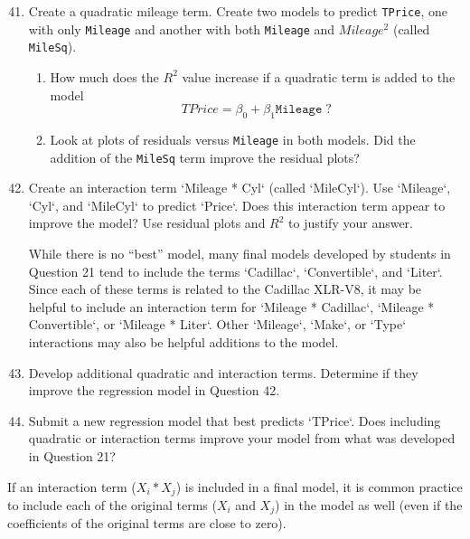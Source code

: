 \documentclass[
]{report}
\begin{document}
\begin{enumerate}
  \setcounter{enumi}{40}

  \item Create a quadratic mileage term. Create two models to predict \texttt{TPrice}, one with only \texttt{Mileage} and another with both \texttt{Mileage} and $\scriptstyle Mileage^2$ (called \texttt{MileSq}).

  \begin{enumerate}
    \item How much does the $\scriptstyle {R}^2$ value increase if a quadratic term is added to the model
    \[
      TPrice = \beta_0 + \beta_1 \texttt{Mileage} \; ?
    \]
    
    \item Look at plots of residuals versus \texttt{Mileage} in both models. Did the addition of the \texttt{MileSq} term improve the residual plots?
  \end{enumerate}

  \item Create an interaction term `Mileage * Cyl` (called `MileCyl`). Use `Mileage`, `Cyl`, and `MileCyl` to predict `Price`. Does this interaction term appear to improve the model? Use residual plots and $\scriptstyle {R}^2$ to justify your answer.

  While there is no “best” model, many final models developed by students in Question 21 tend to include the terms `Cadillac`, `Convertible`, and `Liter`. Since each of these terms is related to the Cadillac XLR-V8, it may be helpful to include an interaction term for `Mileage * Cadillac`, `Mileage * Convertible`, or `Mileage * Liter`. Other `Mileage`, `Make`, or `Type` interactions may also be helpful additions to the model.

  \item Develop additional quadratic and interaction terms. Determine if they improve the regression model in Question 42.

  \item Submit a new regression model that best predicts `TPrice`. Does including quadratic or interaction terms improve your model from what was developed in Question 21?
\end{enumerate}

If an interaction term (\(\scriptstyle X_i * X_j\)) is included in a final model, it is common practice to include each of the original terms (\(\scriptstyle X_i\) and \(\scriptstyle X_j\)) in the model as well (even if the coefficients of the original terms are close to zero).
\end{document}
